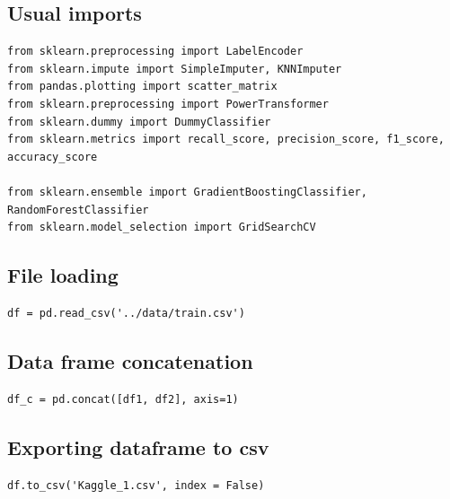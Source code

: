 \documentclass[24pt]{article}
\begin{document}
\subsection{Usual imports}
\begin{lstlisting}
from sklearn.preprocessing import LabelEncoder
from sklearn.impute import SimpleImputer, KNNImputer
from pandas.plotting import scatter_matrix
from sklearn.preprocessing import PowerTransformer
from sklearn.dummy import DummyClassifier
from sklearn.metrics import recall_score, precision_score, f1_score, accuracy_score

from sklearn.ensemble import GradientBoostingClassifier, RandomForestClassifier
from sklearn.model_selection import GridSearchCV
\end{lstlisting}



\subsection{File loading}
\begin{lstlisting}
df = pd.read_csv('../data/train.csv')
\end{lstlisting}


\subsection{Data frame concatenation}
\begin{lstlisting}
df_c = pd.concat([df1, df2], axis=1)
\end{lstlisting}



\subsection{Exporting dataframe to csv}
\begin{lstlisting}
df.to_csv('Kaggle_1.csv', index = False)
\end{lstlisting}





\end{document}

